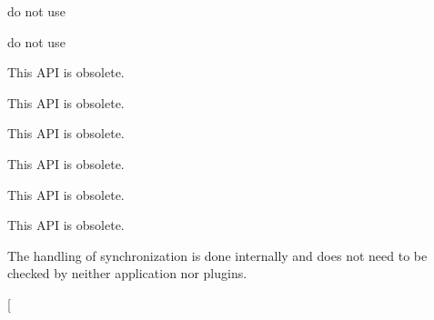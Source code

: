 \begin{DoxyRefList}
\item[\label{deprecated__deprecated000008}%
\hypertarget{deprecated__deprecated000008}{}%
Global \hyperlink{group__key_gga91fb3178848bd682000958089abbaf40ab089c5e7977d6e58737eb586ee153b7f}{K\+E\+Y\+\_\+\+N\+U\+L\+L} ]do not use  
\item[\label{deprecated__deprecated000001}%
\hypertarget{deprecated__deprecated000001}{}%
Global \hyperlink{group__key_gga91fb3178848bd682000958089abbaf40a28f01a87d65f065172f734c9c9446c0e}{K\+E\+Y\+\_\+\+U\+I\+D} ]do not use  
\item[\label{deprecated__deprecated000020}%
\hypertarget{deprecated__deprecated000020}{}%
Global \hyperlink{group__meta_ga6b05da399c3c78904969ef39f191b0eb}{key\+Get\+A\+Time} (const Key $\ast$key)]This A\+P\+I is obsolete. 
\item[\label{deprecated__deprecated000024}%
\hypertarget{deprecated__deprecated000024}{}%
Global \hyperlink{group__meta_ga2c213c120cbe02201278ef7fb8cd94be}{key\+Get\+C\+Time} (const Key $\ast$key)]This A\+P\+I is obsolete. 
\item[\label{deprecated__deprecated000015}%
\hypertarget{deprecated__deprecated000015}{}%
Global \hyperlink{group__meta_ga46a95e81d7d7f4e3eb59e60e5f3738c0}{key\+Get\+G\+I\+D} (const Key $\ast$key)]This A\+P\+I is obsolete. 
\item[\label{deprecated__deprecated000018}%
\hypertarget{deprecated__deprecated000018}{}%
Global \hyperlink{group__meta_gabc0cec592ce3b77e9bc33dbc8e8f6bdc}{key\+Get\+Mode} (const Key $\ast$key)]This A\+P\+I is obsolete. 
\item[\label{deprecated__deprecated000022}%
\hypertarget{deprecated__deprecated000022}{}%
Global \hyperlink{group__meta_ga57689eb5691679071463b777ae786ae9}{key\+Get\+M\+Time} (const Key $\ast$key)]This A\+P\+I is obsolete. 
\item[\label{deprecated__deprecated000013}%
\hypertarget{deprecated__deprecated000013}{}%
Global \hyperlink{group__meta_gacaa5060e67b03f50ae49a3620c54bc46}{key\+Get\+U\+I\+D} (const Key $\ast$key)]This A\+P\+I is obsolete. 
\item[\label{deprecated__deprecated000012}%
\hypertarget{deprecated__deprecated000012}{}%
Global \hyperlink{group__keytest_gaf247df0de7aca04b32ef80e39ef12950}{key\+Need\+Sync} (const Key $\ast$key)]The handling of synchronization is done internally and does not need to be checked by neither application nor plugins. 
\item[\label{deprecated__deprecated000010}%
\hypertarget{deprecated__deprecated000010}{}%

\end{DoxyRefList}
